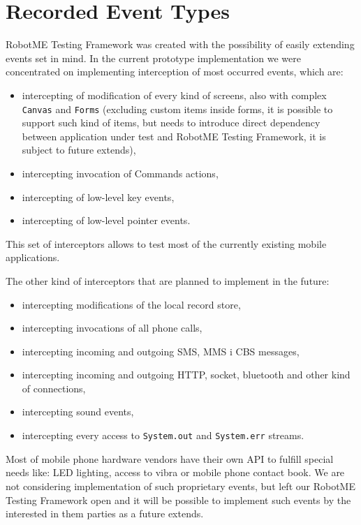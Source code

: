 \section{Recorded Event Types}

RobotME Testing Framework was created with the possibility of easily extending events set in mind.
In the current prototype implementation we were concentrated on implementing interception of most
occurred events, which are:
\begin{itemize}
\item  intercepting of modification of every kind of screens, also with complex 
\texttt{Canvas} and \texttt{Forms} (excluding custom items inside forms,
 it is possible to support such kind of items, but needs to introduce direct dependency between
 application under test and RobotME Testing Framework,
 it is subject to future extends),
\item  intercepting invocation of Commands actions,
\item  intercepting of low-level key events,
\item  intercepting of low-level pointer events.
\end{itemize}

This set of interceptors allows to test most of the currently existing mobile applications.

The other kind of interceptors that are planned to implement in the future:
\begin{itemize}
\item  intercepting modifications of the local record store,
\item  intercepting invocations of all phone calls,
\item  intercepting incoming and outgoing SMS, MMS i CBS messages,
\item  intercepting incoming and outgoing HTTP, socket, bluetooth and other kind of connections,
\item  intercepting sound events,
\item  intercepting every access to \texttt{System.out} and \texttt{System.err} streams.
\end{itemize}

Most of mobile phone hardware vendors have their own API to fulfill special needs like: LED lighting,
access to vibra or mobile phone contact book. We are not considering implementation of such
proprietary events, but left our RobotME Testing Framework open and it will be possible to
implement such events by the interested in them parties as a future extends.
